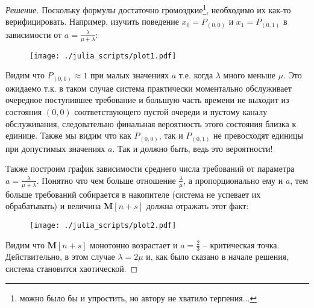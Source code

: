 \documentclass[12pt,a4paper]{article}
\newcommand{\mean}[1]{\mathbf{M}[#1]}
\begin{document}
\begin{proof}[Решение]
	Поскольку формулы достаточно громоздкие\footnote{можно было бы и упростить, но автору не хватило терпения...}, необходимо их как-то верифицировать. Например, изучить поведение $x_0 = P_{(0, 0)}$ и $x_1 = P_{(0, 1)}$ в зависимости от $a = \frac{\lambda}{\mu + \lambda}$:
	
	\begin{figure}[h!]
		\centering
		\texttt{[image: ./julia\_scripts/plot1.pdf]}
	\end{figure}

	Видим что $P_{(0, 0)} \approx 1$ при малых значениях $a$ т.е. когда $\lambda$ много меньше $\mu$. Это ожидаемо т.к. в таком случае система практически моментально обслуживает очередное поступившее требование и большую часть времени не выходит из состояния $(0, 0)$ соответствующего пустой очереди и пустому каналу обслуживания, следовательно финальная вероятность этого состояния близка к единице. Также мы видим что как $P_{(0, 0)}$, так и $P_{(0, 1)}$ не превосходят единицы при допустимых значениях $a$. Так и должно быть, ведь это вероятности!
	
	\newpage
	
	Также построим график зависимости среднего числа требований от параметра $a = \frac{\lambda}{\mu + \lambda}$. Понятно что чем больше отношение $\frac{\lambda}{\mu}$, а пропорционально ему и $a$, тем больше требований собирается в накопителе (система не успевает их обрабатывать) и величина $\mean{n+s}$ должна отражать этот факт:
	\begin{figure}[h!]
		\centering
		\texttt{[image: ./julia\_scripts/plot2.pdf]}
	\end{figure}

	Видим что $\mean{n+s}$ монотонно возрастает и $a = \frac{2}{3}$ -- критическая точка. Действительно, в этом случае $\lambda = 2\mu$ и, как было сказано в начале решения, система становится хаотической.
\end{proof}
	
\end{document}

